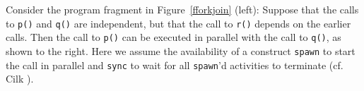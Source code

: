 Consider the program fragment in
Figure~\ref{fforkjoin} (left):
Suppose that the calls to {\tt p()} and {\tt q()} are independent,
but that the call to {\tt r()} depends on the earlier calls. Then
the call to {\tt p()} can be
executed in parallel with
the call to {\tt q()}, as shown to the right.
Here we assume the availability of a construct {\tt spawn} to start
the call in parallel and {\tt sync} to wait for all {\tt spawn}'d
activities to terminate (cf. Cilk
).


